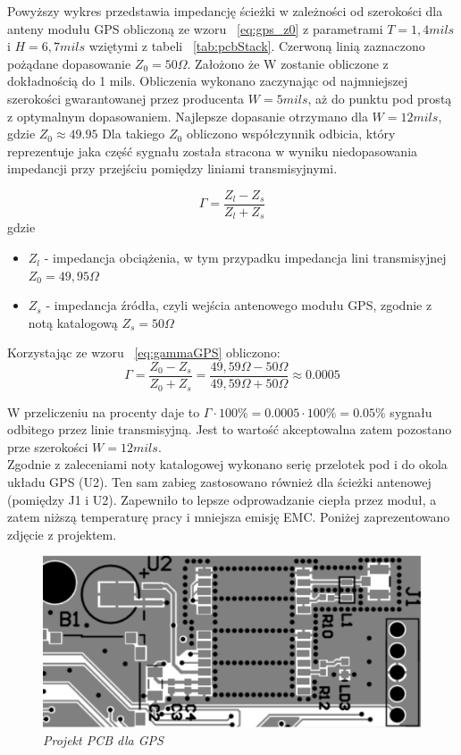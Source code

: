 \documentclass[eng,printmode]{mgr}
\begin{document}
Powyższy wykres przedstawia impedancję ścieżki w zależności od szerokości dla anteny modułu GPS obliczoną ze wzoru ~\ref{eq:gps_z0} z parametrami $T = 1,4 mils$ i $H = 6,7 mils$ wziętymi z tabeli ~\ref{tab:pcbStack}. Czerwoną linią zaznaczono pożądane dopasowanie $Z_0 = 50 \Omega$. Założono że W zostanie obliczone z dokładnością do 1 mils. Obliczenia wykonano zaczynając od najmniejszej szerokości gwarantowanej przez producenta $W = 5 mils$, aż do punktu pod prostą z optymalnym dopasowaniem. Najlepsze dopasanie otrzymano dla $W = 12 mils$, gdzie $Z_0 \approx 49.95$
Dla takiego $Z_0$ obliczono współczynnik odbicia, który reprezentuje jaka część sygnału została stracona w wyniku niedopasowania impedancji przy przejściu pomiędzy liniami transmisyjnymi.

\begin{equation}
\Gamma= \frac{Z_l - Z_s}{Z_l + Z_s} \label{eq:gammaGPS}
\end{equation}
gdzie
\begin{itemize}
  \item $Z_l$ - impedancja obciążenia, w tym przypadku impedancja lini transmisyjnej $Z_0 = 49,95 \Omega$
  \item $Z_s$ - impedancja źródła, czyli wejścia antenowego modułu GPS, zgodnie z notą katalogową $Z_s = 50 \Omega$
\end{itemize}

Korzystając ze wzoru ~\ref{eq:gammaGPS} obliczono:
\begin{equation}
\Gamma= \frac{Z_0 - Z_s}{Z_0 + Z_s} = \frac{49,59\Omega -50\Omega}{49,59\Omega  + 50\Omega } \approx 0.0005
\end{equation}

W przeliczeniu na procenty daje to $\Gamma \cdot 100\% = 0.0005 \cdot 100\% = 0.05\%$ sygnału odbitego przez linie transmisyjną. Jest to wartość akceptowalna zatem pozostano prze szerokości $W = 12 mils$.\\

Zgodnie z zaleceniami noty katalogowej wykonano serię przelotek pod i do okola układu GPS (U2). Ten sam zabieg zastosowano również dla ścieżki antenowej (pomiędzy J1 i U2). Zapewniło to lepsze odprowadzanie ciepła przez moduł, a zatem niższą temperaturę pracy i mniejsza emisję EMC. Poniżej zaprezentowano zdjęcie z projektem.
\begin{figure}[!h]
    \centering
    \includegraphics[width=15cm]{pcb/gps.png}
    \caption{\textit{\scriptsize Projekt PCB dla GPS}}
\end{figure}
\end{document}
